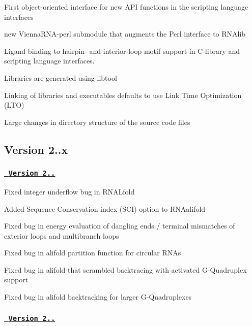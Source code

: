 \begin{DoxyItemize}
\item First object-\/oriented interface for new A\+PI functions in the scripting language interfaces
\item new Vienna\+R\+N\+A-\/perl submodule that augments the Perl interface to R\+N\+Alib
\item Ligand binding to hairpin-\/ and interior-\/loop motif support in C-\/library and scripting language interfaces.
\item Libraries are generated using libtool
\item Linking of libraries and executables defaults to use Link Time Optimization (L\+TO)
\item Large changes in directory structure of the source code files
\end{DoxyItemize}

\subsection*{Version 2..\+x}

\subsubsection*{\href{https://github.com/ViennaRNA/ViennaRNA/compare/v2.1.8...v2.1.9}{\texttt{ Version 2..}}}


\begin{DoxyItemize}
\item Fixed integer underflow bug in R\+N\+A\+Lfold
\item Added Sequence Conservation index (S\+CI) option to R\+N\+Aalifold
\item Fixed bug in energy evaluation of dangling ends / terminal mismatches of exterior loops and multibranch loops
\item Fixed bug in alifold partition function for circular R\+N\+As
\item Fixed bug in alifold that scrambled backtracing with activated G-\/\+Quadruplex support
\item Fixed bug in alifold backtracking for larger G-\/\+Quadruplexes
\end{DoxyItemize}

\subsubsection*{\href{https://github.com/ViennaRNA/ViennaRNA/compare/v2.1.7...v2.1.8}{\texttt{ Version 2..}}}


